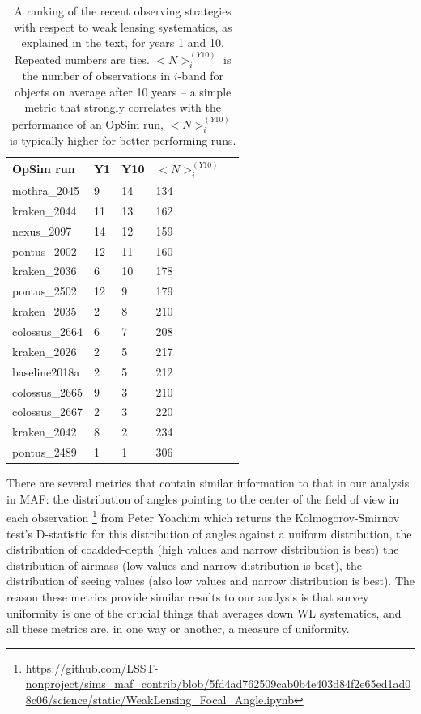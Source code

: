 \begin{table}[ht]
\caption{A ranking of the recent observing strategies with respect to weak lensing systematics, as explained in the text, for years 1 and 10. Repeated numbers are ties. $<N>_i^{(Y10)}$ is the number of observations in $i$-band for objects on average after 10 years -- a simple metric that strongly correlates with the performance of an OpSim run, $<N>_i^{(Y10)}$ is typically higher for better-performing runs.}
\begin{tabular}{lllll}
\label{table:WLSystematicsRankings}
OpSim run & Y1 & Y10 & $<N>_i^{(Y10)}$ \\ \hline
mothra\_2045   & {\color{orange}9} & {\color{red}14}    & 134 \\
kraken\_2044   & {\color{red}11}   & {\color{red}13}    & 162 \\
nexus\_2097    & {\color{red}14}   & {\color{red}12}    & 159 \\
pontus\_2002   & {\color{red}12}   & {\color{red}11}    & 160 \\
kraken\_2036   & {\color{yellow}6} & {\color{orange}10} & 178 \\
pontus\_2502   & {\color{red} 12}  & {\color{orange}9}  & 179 \\
kraken\_2035   & {\color{green}2}  & {\color{yellow}8}  & 210 \\
colossus\_2664 & {\color{yellow}6} & {\color{yellow}7}  & 208 \\
kraken\_2026   & {\color{green}2}  & {\color{yellow}5}  & 217 \\
baseline2018a  & {\color{green}2}  & {\color{yellow}5}  & 212 \\
colossus\_2665 & {\color{orange}9} & {\color{green}3}   & 210 \\ 
colossus\_2667 & {\color{green}2}  & {\color{green}3}   & 220 \\
kraken\_2042   & {\color{orange}8} & {\color{green}2}   & 234 \\
pontus\_2489   & {\color{green}1}  & {\color{green}1}   & 306

\end{tabular}
\end{table}

There are several metrics that contain similar information to that in our analysis in MAF: the distribution of angles pointing to the center of the field of view in each observation \footnote{\url{https://github.com/LSST-nonproject/sims\_maf\_contrib/blob/5fd4ad762509cab0b4e403d84f2e65ed1ad08c06/science/static/WeakLensing\_Focal\_Angle.ipynb}} from Peter Yoachim which returns the Kolmogorov-Smirnov test's D-statistic for this distribution of angles against a uniform distribution, the distribution of coadded-depth (high values and narrow distribution is best) the distribution of airmass (low values and narrow distribution is best), the distribution of seeing values (also low values and narrow distribution is best). The reason these metrics provide similar results to our analysis is that survey uniformity is one of the crucial things that averages down WL systematics, and all these metrics are, in one way or another, a measure of uniformity.



